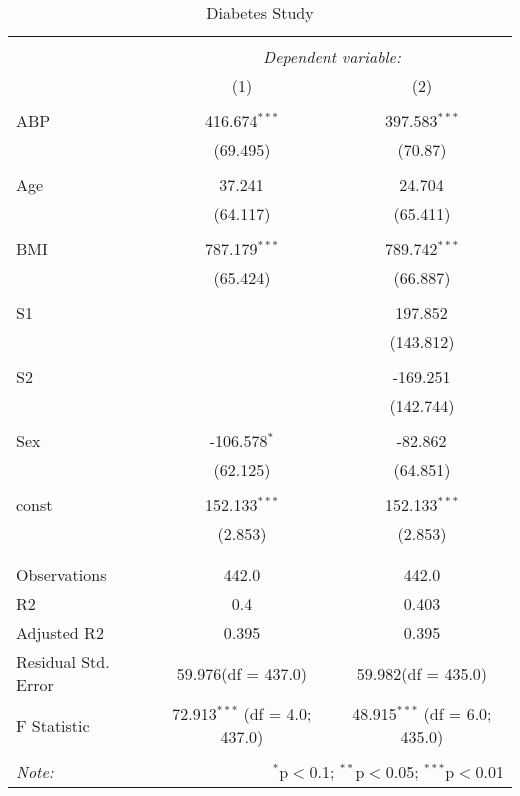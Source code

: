 \documentclass[12pt]{article}
\numberwithin{equation}{subsection}
\begin{document}
\begin{table}[!htbp] \centering
  \caption{Diabetes Study}
  \label{}
\begin{tabular}{@{\extracolsep{5pt}}lcc}
\\[-1.8ex]\hline
\hline \\[-1.8ex]
& \multicolumn{2}{c}{\textit{Dependent variable:}} \
\cr \cline{2-3}
\\[-1.8ex] & (1) & (2) \\
\hline \\[-1.8ex]
 ABP & 416.674$^{***}$ & 397.583$^{***}$ \\
  & (69.495) & (70.87) \\
  & & \\
 Age & 37.241$^{}$ & 24.704$^{}$ \\
  & (64.117) & (65.411) \\
  & & \\
 BMI & 787.179$^{***}$ & 789.742$^{***}$ \\
  & (65.424) & (66.887) \\
  & & \\
 S1 & & 197.852$^{}$ \\
  & & (143.812) \\
  & & \\
 S2 & & -169.251$^{}$ \\
  & & (142.744) \\
  & & \\
 Sex & -106.578$^{*}$ & -82.862$^{}$ \\
  & (62.125) & (64.851) \\
  & & \\
 const & 152.133$^{***}$ & 152.133$^{***}$ \\
  & (2.853) & (2.853) \\
  & & \\
\hline \\[-1.8ex]
 Observations & 442.0 & 442.0 \\
 R${2}$ & 0.4 & 0.403 \\
 Adjusted R${2}$ & 0.395 & 0.395 \\
 Residual Std. Error & 59.976(df = 437.0) & 59.982(df = 435.0)  \\
 F Statistic & 72.913$^{***}$ (df = 4.0; 437.0) & 48.915$^{***}$ (df = 6.0; 435.0) \\
\hline
\hline \\[-1.8ex]
\textit{Note:} & \multicolumn{2}{r}{$^{*}$p$<$0.1; $^{**}$p$<$0.05; $^{***}$p$<$0.01} \\
\end{tabular}
\end{table}
\end{document}
